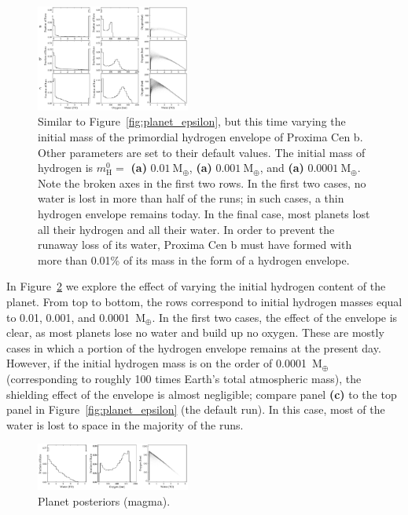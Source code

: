 \documentclass[]{emulateapj}
\begin{document}
\begin{figure}[hbt]
  \begin{center}
      \includegraphics[width=0.45\textwidth]{figures/planet_hydrogen.pdf}
       \caption{Similar to Figure~\ref{fig:planet_epsilon}, but this time varying the initial mass of the primordial
       hydrogen envelope of Proxima Cen b. Other parameters are set to their default values. The initial mass of hydrogen
       is $m_\mathrm{H}^0 =$ \textbf{(a)} $0.01\ \mathrm{M_\oplus}$, \textbf{(a)} $0.001\ \mathrm{M_\oplus}$, and
       \textbf{(a)} $0.0001\ \mathrm{M_\oplus}$. Note the broken axes in the first two rows. In the first two cases,
       no water is lost in more than half of the runs; in such cases, a thin hydrogen envelope remains today. In the
       final case, most planets lost all their hydrogen and all their water. In order to prevent the runaway loss
       of its water, Proxima Cen b must have formed with more than 0.01\% of its mass in the form of a hydrogen envelope.
       }
     \label{fig:planet_hydrogen}
  \end{center}
\end{figure}

In Figure~\ref{fig:planet_hydrogen} we explore the effect of varying the initial hydrogen content of the planet.
From top to bottom, the rows correspond to initial hydrogen masses equal to 0.01, 0.001, and 0.0001~$\mathrm{M_\oplus}$.
In the first two cases, the effect of the envelope is clear, as most planets lose no water and build up no oxygen.
These are mostly cases in which a portion of the hydrogen envelope remains at the present day. However, if the
initial hydrogen mass is on the order of 0.0001~$\mathrm{M_\oplus}$ (corresponding to roughly 100 times Earth's
total atmospheric mass), the shielding effect of the envelope is 
almost negligible; compare panel \textbf{(c)} to the top panel in Figure~\ref{fig:planet_epsilon} (the default run).
In this case, most of the water is lost to space in the majority of the runs.

\begin{figure}[hbt]
  \begin{center}
      \includegraphics[width=0.45\textwidth]{figures/planet_magma.pdf}
       \caption{Planet posteriors (magma).}
     \label{fig:planet_hydrogen}
  \end{center}
\end{figure}
\end{document}
